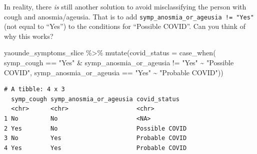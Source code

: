 \documentclass[
  letterpaper,
  DIV=11,
  numbers=noendperiod]{scrreprt}
\newenvironment{Shaded}{\begin{snugshade}}{\end{snugshade}}
\newcommand{\AttributeTok}[1]{\textcolor[rgb]{0.40,0.45,0.13}{#1}}
\newcommand{\FunctionTok}[1]{\textcolor[rgb]{0.28,0.35,0.67}{#1}}
\newcommand{\NormalTok}[1]{\textcolor[rgb]{0.00,0.23,0.31}{#1}}
\newcommand{\SpecialCharTok}[1]{\textcolor[rgb]{0.37,0.37,0.37}{#1}}
\newcommand{\StringTok}[1]{\textcolor[rgb]{0.13,0.47,0.30}{#1}}
\begin{document}
\begin{tcolorbox}[enhanced jigsaw, titlerule=0mm, colback=white, left=2mm, breakable, opacitybacktitle=0.6, colbacktitle=quarto-callout-note-color!10!white, colframe=quarto-callout-note-color-frame, bottomtitle=1mm, opacityback=0, coltitle=black, arc=.35mm, toptitle=1mm, title=\textcolor{quarto-callout-note-color}{\faInfo}\hspace{0.5em}{Challenge}, leftrule=.75mm, toprule=.15mm, bottomrule=.15mm, rightrule=.15mm]

In reality, there \emph{is} still another solution to avoid
misclassifying the person with cough and anosmia/ageusia. That is to add
\texttt{symp\_anosmia\_or\_ageusia\ !=\ "Yes"} (not equal to ``Yes'') to
the conditions for ``Possible COVID''. Can you think of why this works?

\begin{Shaded}
\begin{Highlighting}[]
\NormalTok{yaounde\_symptoms\_slice }\SpecialCharTok{\%\textgreater{}\%} 
  \FunctionTok{mutate}\NormalTok{(}\AttributeTok{covid\_status =} \FunctionTok{case\_when}\NormalTok{(}
\NormalTok{    symp\_cough }\SpecialCharTok{==} \StringTok{"Yes"} \SpecialCharTok{\&}\NormalTok{ symp\_anosmia\_or\_ageusia }\SpecialCharTok{!=} \StringTok{"Yes"} \SpecialCharTok{\textasciitilde{}} \StringTok{"Possible COVID"}\NormalTok{,}
\NormalTok{    symp\_anosmia\_or\_ageusia }\SpecialCharTok{==} \StringTok{"Yes"} \SpecialCharTok{\textasciitilde{}} \StringTok{"Probable COVID"}\NormalTok{))}
\end{Highlighting}
\end{Shaded}

\begin{verbatim}
# A tibble: 4 x 3
  symp_cough symp_anosmia_or_ageusia covid_status  
  <chr>      <chr>                   <chr>         
1 No         No                      <NA>          
2 Yes        No                      Possible COVID
3 No         Yes                     Probable COVID
4 Yes        Yes                     Probable COVID
\end{verbatim}

\end{tcolorbox}
\end{document}
